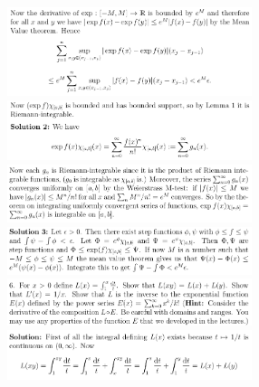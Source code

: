 \documentclass[8pt,landscape]{article}
\begin{document}
\begin{multicols}{3}
    \includegraphics[width=270]{039.png} \\
    \includegraphics[width=270]{040.png} \\
    \includegraphics[width=270]{041.png} \\
    \includegraphics[width=270]{042.png} \\
    \includegraphics[width=270]{043.png} \\
    \includegraphics[width=270]{044.png} \\

\end{multicols}
\end{document}
